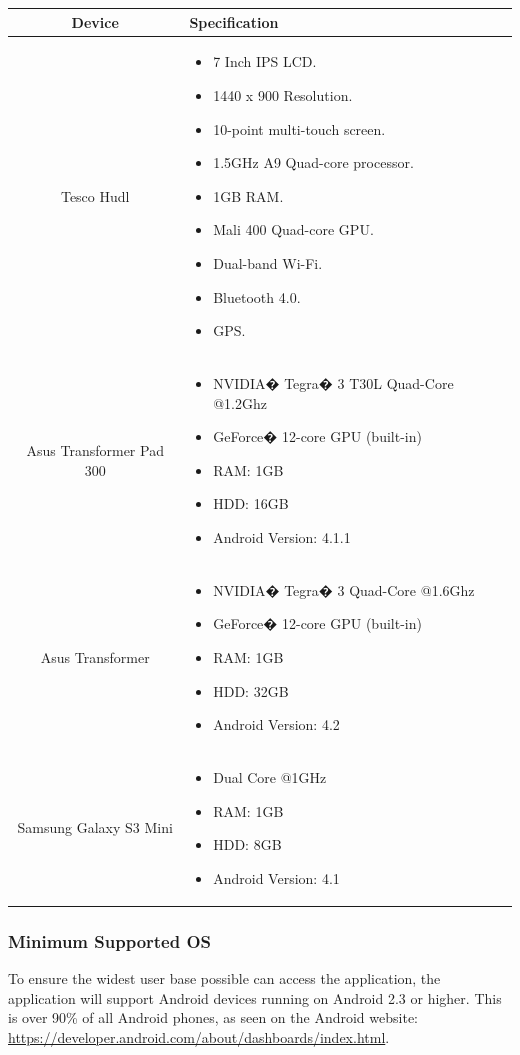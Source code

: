 \documentclass[11pt,a4paper]{article}
\begin{document}
\begin{center}
\begin{tabular}{c|p{8cm}}
\textbf{Device} & \textbf{Specification} \\ \hline
Tesco Hudl & \begin{itemize}
\item 7 Inch IPS LCD.
\item 1440 x 900 Resolution.
\item 10-point multi-touch screen.
\item 1.5GHz A9 Quad-core processor.
\item 1GB RAM.
\item Mali 400 Quad-core GPU.
\item Dual-band Wi-Fi.
\item Bluetooth 4.0.
\item GPS.
\end{itemize} \\ \hline
Asus Transformer Pad 300 & 	\begin{itemize}
	\item NVIDIA� Tegra� 3 T30L Quad-Core @1.2Ghz
	\item GeForce� 12-core GPU (built-in)
	\item RAM: 1GB
	\item HDD: 16GB
	\item Android Version: 4.1.1
	\end{itemize} \\ \hline
Asus Transformer & \begin{itemize}
	\item NVIDIA� Tegra� 3 Quad-Core @1.6Ghz
	\item GeForce� 12-core GPU (built-in)
	\item RAM: 1GB
	\item HDD: 32GB
	\item Android Version: 4.2
\end{itemize} \\ \hline
Samsung Galaxy S3 Mini & \begin{itemize}
\item Dual Core @1GHz
\item RAM: 1GB
\item HDD: 8GB
\item Android Version: 4.1
\end{itemize} \\ \hline
\end{tabular}
\end{center}

\subsubsection{Minimum Supported OS}
To ensure the widest user base possible can access the application, the application will support Android devices running on Android 2.3 or higher. This is over 90\% of all Android phones, as seen on the Android website: \url{https://developer.android.com/about/dashboards/index.html}.
\end{document}
